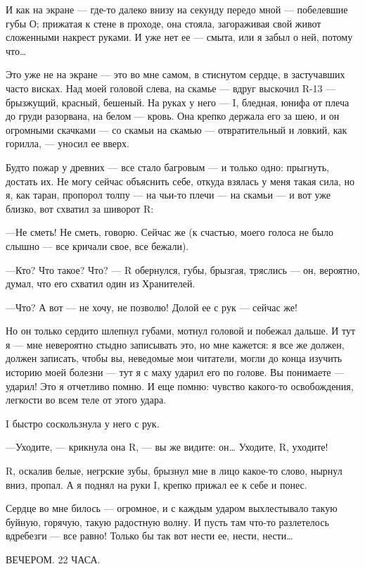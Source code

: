 \documentclass[11pt,openany]{book}
\begin{document}
И как на экране --- где-то далеко внизу на секунду передо мной --- побелевшие губы О; прижатая к стене в проходе, она стояла, загораживая свой живот сложенными накрест руками. И уже нет ее --- смыта, или я забыл о ней, потому что\ldots{}

Это уже не на экране --- это во мне самом, в стиснутом сердце, в застучавших часто висках. Над моей головой слева, на скамье --- вдруг выскочил R-13 --- брызжущий, красный, бешеный. На руках у него --- I, бледная, юнифа от плеча до груди разорвана, на белом --- кровь. Она крепко держала его за шею, и он огромными скачками --- со скамьи на скамью --- отвратительный и ловкий, как горилла, --- уносил ее вверх.

Будто пожар у древних --- все стало багровым --- и только одно: прыгнуть, достать их. Не могу сейчас объяснить себе, откуда взялась у меня такая сила, но я, как таран, пропорол толпу --- на чьи-то плечи --- на скамьи --- и вот уже близко, вот схватил за шиворот R:

---Не сметь! Не сметь, говорю. Сейчас же (к счастью, моего голоса не было слышно --- все кричали свое, все бежали).

---Кто? Что такое? Что? --- R обернулся, губы, брызгая, тряслись --- он, вероятно, думал, что его схватил один из Хранителей.

---Что? А вот --- не хочу, не позволю! Долой ее с рук --- сейчас же!

Но он только сердито шлепнул губами, мотнул головой и побежал дальше. И тут я --- мне невероятно стыдно записывать это, но мне кажется: я все же должен, должен записать, чтобы вы, неведомые мои читатели, могли до конца изучить историю моей болезни --- тут я с маху ударил его по голове. Вы понимаете --- ударил! Это я отчетливо помню. И еще помню: чувство какого-то освобождения, легкости во всем теле от этого удара.

I быстро соскользнула у него с рук.

---Уходите, --- крикнула она R, --- вы же видите: он\ldots{} Уходите, R, уходите!

R, оскалив белые, негрские зубы, брызнул мне в лицо какое-то слово, нырнул вниз, пропал. А я поднял на руки I, крепко прижал ее к себе и понес.

Сердце во мне билось --- огромное, и с каждым ударом выхлестывало такую буйную, горячую, такую радостную волну. И пусть там что-то разлетелось вдребезги --- все равно! Только бы так вот нести ее, нести, нести\ldots{}

\begin{center}\textsc{ВЕЧЕРОМ. 22 ЧАСА.}\end{center}
\end{document}
